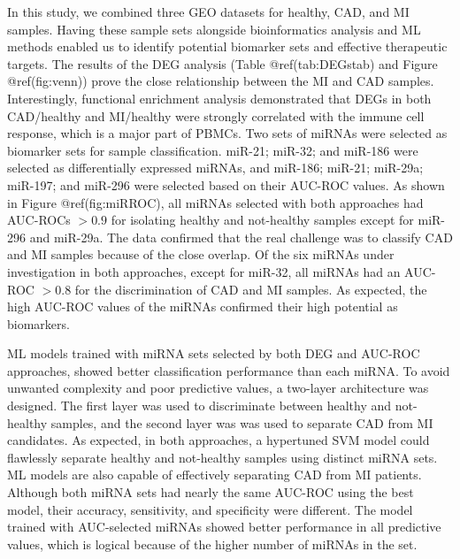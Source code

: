 \documentclass[smallextended]{svjour3}       %
\begin{document}
In this study, we combined three GEO datasets for healthy, CAD, and MI
samples. Having these sample sets alongside bioinformatics analysis and
ML methods enabled us to identify potential biomarker sets and effective
therapeutic targets. The results of the DEG analysis (Table
@ref(tab:DEGstab) and Figure @ref(fig:venn)) prove the close
relationship between the MI and CAD samples. Interestingly, functional
enrichment analysis demonstrated that DEGs in both CAD/healthy and
MI/healthy were strongly correlated with the immune cell response, which
is a major part of PBMCs. Two sets of miRNAs were selected as biomarker
sets for sample classification. miR-21; miR-32; and miR-186 were
selected as differentially expressed miRNAs, and miR-186; miR-21;
miR-29a; miR-197; and miR-296 were selected based on their AUC-ROC
values. As shown in Figure @ref(fig:miRROC), all miRNAs selected with
both approaches had AUC-ROCs \(> 0.9\) for isolating healthy and
not-healthy samples except for miR-296 and miR-29a. The data confirmed
that the real challenge was to classify CAD and MI samples because of
the close overlap. Of the six miRNAs under investigation in both
approaches, except for miR-32, all miRNAs had an AUC-ROC \(> 0.8\) for
the discrimination of CAD and MI samples. As expected, the high AUC-ROC
values of the miRNAs confirmed their high potential as biomarkers.

ML models trained with miRNA sets selected by both DEG and AUC-ROC
approaches, showed better classification performance than each miRNA. To
avoid unwanted complexity and poor predictive values, a two-layer
architecture was designed. The first layer was used to discriminate
between healthy and not-healthy samples, and the second layer was was
used to separate CAD from MI candidates. As expected, in both
approaches, a hypertuned SVM model could flawlessly separate healthy and
not-healthy samples using distinct miRNA sets. ML models are also
capable of effectively separating CAD from MI patients. Although both
miRNA sets had nearly the same AUC-ROC using the best model, their
accuracy, sensitivity, and specificity were different. The model trained
with AUC-selected miRNAs showed better performance in all predictive
values, which is logical because of the higher number of miRNAs in the
set.
\end{document}

